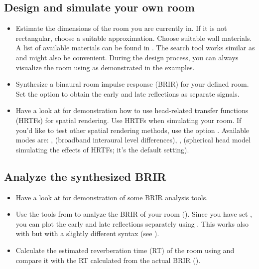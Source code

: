 \documentclass[a4paper, fleqn, 11pt]{article}
\begin{document}
\subsection{Design and simulate your own room}
\label{task:design}
\begin{itemize}
  \item Estimate the dimensions of the room you are currently in. If it is not rectangular, choose a suitable approximation. Choose suitable wall materials. A list of available materials can be found in . The search tool  works similar as  and might also be convenient. During the design process, you can always visualize the room using  as demonstrated in the examples.
  \item Synthesize a binaural room impulse response (BRIR) for your defined room. Set the option  to obtain the early and late reflections as separate signals.
  \item Have a look at  for demonstration how to use head-related transfer functions (HRTFs) for spatial rendering. Use HRTFs when simulating your room.
  If you’d like to test other spatial rendering methods, use the option . Available modes are: ,  (broadband interaural level differences), ,  (spherical head model simulating the effects of HRTFs; it’s the default setting).
\end{itemize}

\newpage
\subsection{Analyze the synthesized BRIR}
\begin{itemize}
  \item Have a look at  for demonstration of some BRIR analysis tools.
  \item Use the tools from  to analyze the BRIR of your room 
  (). Since you have set , you can plot the early and late reflections separately using . This works also with  but with a slightly different syntax (see ).
  \item Calculate the estimated reverberation time (RT) of the room using  and compare it with the RT calculated from the actual BRIR ().
\end{itemize}
\end{document}

